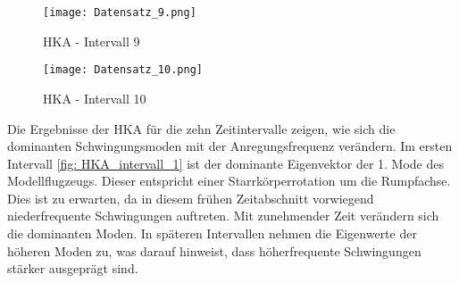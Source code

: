         \begin{figure}[H]
            \centering
            \texttt{[image: Datensatz\_9.png]}
            \caption{HKA - Intervall 9}
            \label{fig: HKA_intervall_9}
        \end{figure}

        \begin{figure}[H]
            \centering
            \texttt{[image: Datensatz\_10.png]}
            \caption{HKA - Intervall 10}
            \label{fig: HKA_intervall_10}
        \end{figure}

        \noindent
        Die Ergebnisse der HKA für die zehn Zeitintervalle zeigen, wie sich die
        dominanten Schwingungsmoden mit der Anregungsfrequenz verändern. Im ersten
        Intervall \ref{fig: HKA_intervall_1} ist der dominante Eigenvektor der
        1. Mode des Modellflugzeugs. Dieser entspricht einer Starrkörperrotation
        um die Rumpfachse. Dies ist zu erwarten, da in diesem frühen Zeitabschnitt
        vorwiegend niederfrequente Schwingungen auftreten. Mit zunehmender Zeit
        verändern sich die dominanten Moden. In späteren Intervallen nehmen die
        Eigenwerte der höheren Moden zu, was darauf hinweist, dass höherfrequente
        Schwingungen stärker ausgeprägt sind. 
